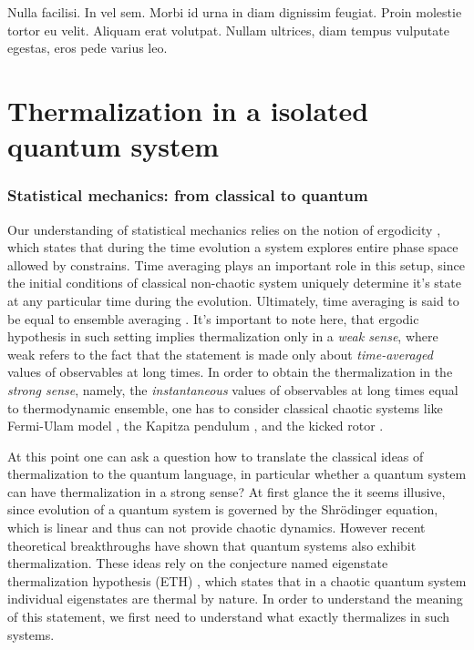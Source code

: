 \begin{savequote}[75mm]
Nulla facilisi. In vel sem. Morbi id urna in diam dignissim feugiat. Proin molestie tortor eu velit. Aliquam erat volutpat. Nullam ultrices, diam tempus vulputate egestas, eros pede varius leo.
\end{savequote}

\chapter{Thermalization in a isolated quantum system}

\subsection{Statistical mechanics: from  classical to quantum}
Our understanding of statistical mechanics relies on the notion of ergodicity \cite{Penrose1970, Dalessio2016}, which states that during the time evolution a system explores entire phase space allowed by constrains. Time averaging plays an important role in this setup, since the initial conditions of classical non-chaotic system uniquely determine it's state at any particular time during the evolution. Ultimately, time averaging is said to be equal to ensemble averaging \cite{Penrose1970, Dalessio2016}. It's important to note here, that ergodic hypothesis in such setting implies thermalization only in a \textit{weak sense}, where weak refers to the fact that the statement is made only about \textit{time-averaged} values of observables at long times. In order to obtain the thermalization in the \textit{strong sense}, namely, the \textit{instantaneous} values of observables at long times equal to thermodynamic ensemble, one has to consider classical chaotic systems like Fermi-Ulam model \cite{Lichtenberg1992}, the Kapitza pendulum \cite{Broer2004}, and the kicked rotor \cite{Chirikov1979}.

At this point one can ask a question how to translate the classical ideas of thermalization to the quantum language, in particular whether a quantum system can have thermalization in a strong sense? At first glance the it seems illusive, since evolution of a quantum system is governed by the Shr\"odinger equation, which is linear and thus can not provide chaotic dynamics. However recent theoretical breakthroughs \cite{Deutsch1991, Srednicki1994, Rigol2008} have shown that quantum systems also exhibit thermalization. These ideas rely on the conjecture named eigenstate thermalization hypothesis (ETH) \cite{Srednicki1999}, which states that in a chaotic quantum system individual eigenstates are thermal by nature. In order to understand the meaning of this statement, we first need to understand what exactly thermalizes in such systems.

